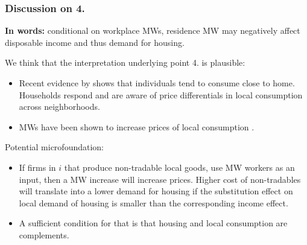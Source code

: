 \documentclass[aspectratio=169, t]{beamer}
\begin{document}
\begin{frame}
    \frametitle{Discussion on 4.}
    
    
    \textbf{In words:} conditional on workplace MWs, residence MW may negatively affect disposable income
     and thus demand for housing.
     
     \pause 
     \vspace{2mm}

    We think that the interpretation underlying point 4. is plausible:
    \begin{itemize}
        \item Recent evidence by \textcite{MiyauchiEtAl2021} shows that individuals tend to consume 
        close to home. Households respond and are aware of price differentials in local consumption across neighborhoods.
        \item MWs have been shown to increase prices of local consumption 
        \parencite[e.g.,][]{AllegrettoReich2018, LeungForthcoming}.
    \end{itemize}

    \pause 
    \vspace{2mm}

    Potential microfoundation:
    \begin{itemize}
        \item If firms in $i$ that produce non-tradable local goods, use MW workers as an input, 
        then a MW increase will increase prices. Higher cost of non-tradables will translate into a 
        lower demand for housing if the substitution effect on local demand of housing is smaller than 
        the corresponding income effect. 
        \item A sufficient condition for that is that housing and local consumption are complements.
    \end{itemize}
\end{frame}
\end{document}

